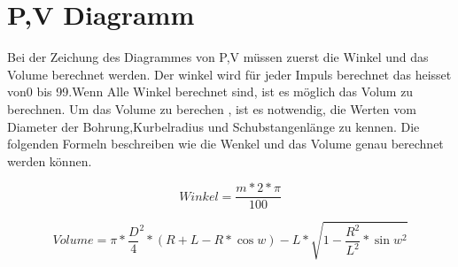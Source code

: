 \section{P,V Diagramm}

Bei der Zeichung des Diagrammes von P,V müssen zuerst die Winkel und das Volume berechnet werden.
Der winkel wird für jeder Impuls berechnet das heisset von0 bis 99.Wenn Alle Winkel berechnet sind, 
ist es möglich das Volum zu berechnen. Um das Volume zu berechen , ist es notwendig, die Werten vom Diameter der Bohrung,Kurbelradius und Schubstangenlänge zu kennen.
Die folgenden Formeln beschreiben wie die Wenkel und das Volume genau berechnet werden können.

\begin{equation}\label{eq:paran}
Winkel = \frac{m*2*\pi}{100}
\end{equation}

\begin{equation}\label{eq:paran}
Volume = \pi*\frac{D}{4}^2*(R+L-R*\cos w)-L*\sqrt{1-\frac{R^2}{L^2}*\sin w^{2}}
\end{equation}
